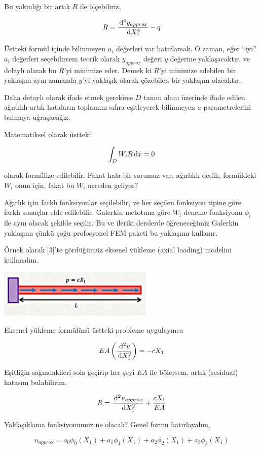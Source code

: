 \documentclass[12pt,fleqn]{article}\usepackage{../../common}
\begin{document}
Bu yakınlığı bir artık $R$ ile ölçebiliriz,

$$
R = \frac{\,\mathrm{d}^4 y_{approx}}{\,\mathrm{d} X_1^4} - q 
$$

Üstteki formül içinde bilinmeyen $a_i$ değerleri var hatırlarsak. O zaman, eğer
``iyi'' $a_i$ değerleri seçebilirsem teorik olarak $y_{approx}$ değeri $y$
değerine yaklaşacaktır, ve dolaylı olarak bu $R$'yi minimize eder. Demek ki
$R$'yi minimize edebilen bir yaklaşım aynı zamanda $y$'yi yaklaşık olarak
çözebilen bir yaklaşım olacaktır. 

Daha detaylı olarak ifade etmek gerekirse $D$ tanım alanı üzerinde ifade edilen
ağırlıklı artık hataların toplamını sıfıra eşitleyerek bilinmeyen $a$
parametrelerini bulmaya uğraşacağız.

Matematiksel olarak üstteki

$$
\int_D W_i R \,\mathrm{d} x = 0
$$

olarak formülize edilebilir. Fakat hala bir sorumuz var, ağırlıklı dedik,
formüldeki $W_i$ onun için, fakat bu $W_i$ nereden geliyor?

Ağırlık için farklı fonksiyonlar seçilebilir, ve her seçilen fonksiyon tipine
göre farklı sonuçlar elde edilebilir. Galerkin metotuna göre $W_i$ deneme
fonksiyonu $\phi_i$ ile aynı olacak şekilde seçilir. Bu ve ileriki derslerde
öğreneceğimiz Galerkin yaklaşımı çünkü çoğu profosyonel FEM paketi bu yaklaşımı
kullanır.

Örnek olarak [3]'te gördüğümüz eksenel yükleme (axial loading) modelini
kullanalım. 

\includegraphics[width=20em]{compscieng_bpp45fem1_01.jpg}

Eksenel yükleme formülünü üstteki probleme uygulayınca

$$
EA \left( \frac{\,\mathrm{d}^2 u}{\,\mathrm{d} X_1^2}  \right) = -c X_1
$$

Eşitliğin sağındakileri sola geçirip her şeyi $EA$ ile bölersem, artık
(residual) hatasını bulabilirim,

$$
R =  \frac{\,\mathrm{d}^2 u_{approx}}{\,\mathrm{d} X_1^2} + \frac{c X_1}{EA}
$$

Yaklaşıklama fonksiyonumuz ne olacak? Genel formu hatırlayalım,

$$
u_{approx} = a_0 \phi_0(X_1) + a_1 \phi_1(X_1) + a_2 \phi_2(X_1) + a_3 \phi_3(X_1) 
$$
\end{document}
